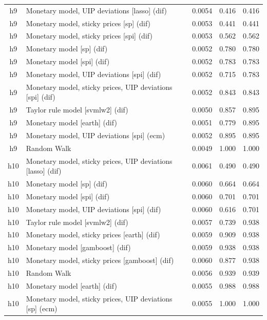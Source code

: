 \begin{ThreePartTable}
\begin{longtable}[t]{cp{5.5cm}ccc}
\addlinespace
h9 & \raggedright Monetary model, UIP deviations [lasso] (dif) & 0.0054 & 0.416 & 0.416\\
h9 & \raggedright Monetary model, sticky prices [sp] (dif) & 0.0053 & 0.441 & 0.441\\
h9 & \raggedright Monetary model, sticky prices [spi] (dif) & 0.0053 & 0.562 & 0.562\\
h9 & \raggedright Monetary model [sp] (dif) & 0.0052 & 0.780 & 0.780\\
h9 & \raggedright Monetary model [spi] (dif) & 0.0052 & 0.783 & 0.783\\
h9 & \raggedright Monetary model, UIP deviations [spi] (dif) & 0.0052 & 0.715 & 0.783\\
h9 & \raggedright Monetary model, sticky prices, UIP deviations [spi] (dif) & 0.0052 & 0.843 & 0.843\\
h9 & \raggedright Taylor rule model [svmlw2] (dif) & 0.0050 & 0.857 & 0.895\\
h9 & \raggedright Monetary model [earth] (dif) & 0.0051 & 0.779 & 0.895\\
h9 & \raggedright Monetary model, UIP deviations [spi] (ecm) & 0.0052 & 0.895 & 0.895\\
h9 & \raggedright Random Walk & 0.0049 & 1.000 & 1.000\\
\addlinespace
h10 & \raggedright Monetary model, sticky prices, UIP deviations [lasso] (dif) & 0.0061 & 0.490 & 0.490\\
h10 & \raggedright Monetary model [sp] (dif) & 0.0060 & 0.664 & 0.664\\
h10 & \raggedright Monetary model [spi] (dif) & 0.0060 & 0.701 & 0.701\\
h10 & \raggedright Monetary model, UIP deviations [spi] (dif) & 0.0060 & 0.616 & 0.701\\
h10 & \raggedright Taylor rule model [svmlw2] (dif) & 0.0057 & 0.739 & 0.938\\
h10 & \raggedright Monetary model, sticky prices [earth] (dif) & 0.0059 & 0.909 & 0.938\\
h10 & \raggedright Monetary model [gamboost] (dif) & 0.0059 & 0.938 & 0.938\\
h10 & \raggedright Monetary model, sticky prices [gamboost] (dif) & 0.0060 & 0.877 & 0.938\\
h10 & \raggedright Random Walk & 0.0056 & 0.939 & 0.939\\
h10 & \raggedright Monetary model [earth] (dif) & 0.0055 & 0.988 & 0.988\\
h10 & \raggedright Monetary model, sticky prices, UIP deviations [sp] (ecm) & 0.0055 & 1.000 & 1.000\\

\end{longtable}
\end{ThreePartTable}
